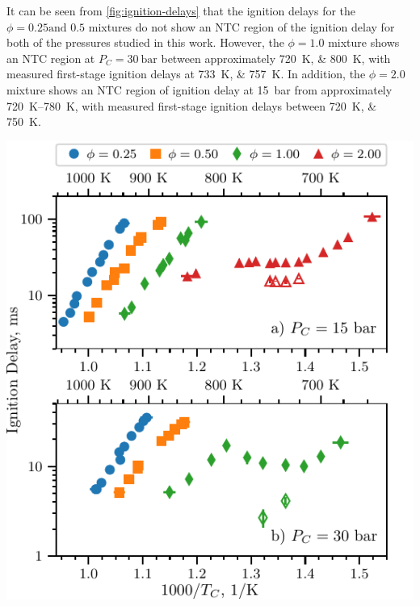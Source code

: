 \documentclass[letterpaper, review, sort&compress]{elsarticle}
\begin{document}
It can be seen from \cref{fig:ignition-delays} that the ignition delays for the \(\phi=0.25\text{
and } 0.5\) mixtures do not show an NTC region of the ignition delay for both of the pressures
studied in this work. However, the \(\phi=1.0\) mixture shows an NTC region at
\(P_C=\SI[number-unit-product={\ }]{30}{\bar}\) between approximately \SIlist{720;800}{\K}, with
measured first-stage ignition delays at \SIlist{733;757}{\K}. In addition, the \(\phi=2.0\) mixture
shows an NTC region of ignition delay at \SI{15}{\bar} from approximately \SIrange{720}{780}{\K},
with measured first-stage ignition delays between \SIlist{720;750}{\K}.

\begin{center}
    \captionsetup{type=figure}
    \includegraphics{figures/ignition-delays.pdf}
    \caption{Ignition delays of MV as a function of inverse temperature for varying equivalence
    ratios. Filled points are the overall ignition delays and hollow points are the first stage
    ignition delays. a) \SI{15}{\bar}, b) \SI{30}{\bar}.}
    \label{fig:ignition-delays}
\end{center}
\end{document}
